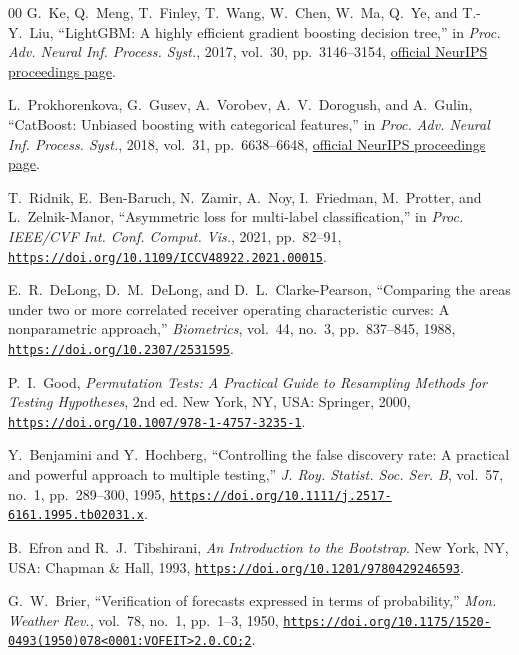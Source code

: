 \documentclass{ieeeaccess}
\begin{document}
\begin{thebibliography}{00}
G.~Ke, Q.~Meng, T.~Finley, T.~Wang, W.~Chen, W.~Ma, Q.~Ye, and T.-Y.~Liu, ``LightGBM: A highly efficient gradient boosting decision tree,'' in \emph{Proc. Adv. Neural Inf. Process. Syst.}, 2017, vol.~30, pp.~3146--3154, \href{https://proceedings.neurips.cc/paper_files/paper/2017/hash/6449f44a102fde848669bdd9eb6b76fa-Abstract.html}{official NeurIPS proceedings page}.

L.~Prokhorenkova, G.~Gusev, A.~Vorobev, A.~V.~Dorogush, and A.~Gulin, ``CatBoost: Unbiased boosting with categorical features,'' in \emph{Proc. Adv. Neural Inf. Process. Syst.}, 2018, vol.~31, pp.~6638--6648, \href{https://proceedings.neurips.cc/paper_files/paper/2018/hash/14491b756b3a51daac41c24863285549-Abstract.html}{official NeurIPS proceedings page}.

T.~Ridnik, E.~Ben-Baruch, N.~Zamir, A.~Noy, I.~Friedman, M.~Protter, and L.~Zelnik-Manor, ``Asymmetric loss for multi-label classification,'' in \emph{Proc. IEEE/CVF Int. Conf. Comput. Vis.}, 2021, pp.~82--91, \href{https://doi.org/10.1109/ICCV48922.2021.00015}{\nolinkurl{https://doi.org/10.1109/ICCV48922.2021.00015}}.

E.~R.~DeLong, D.~M.~DeLong, and D.~L.~Clarke-Pearson, ``Comparing the areas under two or more correlated receiver operating characteristic curves: A nonparametric approach,'' \emph{Biometrics}, vol.~44, no.~3, pp.~837--845, 1988, \href{https://doi.org/10.2307/2531595}{\nolinkurl{https://doi.org/10.2307/2531595}}.

P.~I.~Good, \emph{Permutation Tests: A Practical Guide to Resampling Methods for Testing Hypotheses}, 2nd ed. New York, NY, USA: Springer, 2000, \href{https://doi.org/10.1007/978-1-4757-3235-1}{\nolinkurl{https://doi.org/10.1007/978-1-4757-3235-1}}.

Y.~Benjamini and Y.~Hochberg, ``Controlling the false discovery rate: A practical and powerful approach to multiple testing,'' \emph{J. Roy. Statist. Soc. Ser. B}, vol.~57, no.~1, pp.~289--300, 1995, \href{https://doi.org/10.1111/j.2517-6161.1995.tb02031.x}{\nolinkurl{https://doi.org/10.1111/j.2517-6161.1995.tb02031.x}}.

B.~Efron and R.~J.~Tibshirani, \emph{An Introduction to the Bootstrap}. New York, NY, USA: Chapman \& Hall, 1993, \href{https://doi.org/10.1201/9780429246593}{\nolinkurl{https://doi.org/10.1201/9780429246593}}.

G.~W.~Brier, ``Verification of forecasts expressed in terms of probability,'' \emph{Mon. Weather Rev.}, vol.~78, no.~1, pp.~1--3, 1950, \href{https://doi.org/10.1175/1520-0493(1950)078\%3C0001:VOFEIT\%3E2.0.CO;2}{\nolinkurl{https://doi.org/10.1175/1520-0493(1950)078<0001:VOFEIT>2.0.CO;2}}.

\end{thebibliography}
\end{document}
